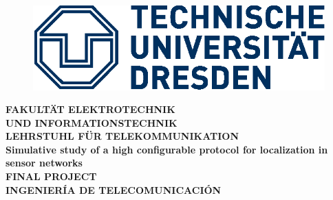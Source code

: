 \begin{center}
  \begin{figure}[ht]
    \begin{center}
      \includegraphics[scale=1]{logo_tud.eps}
    \end{center}
  \end{figure}
  \vspace{0.2cm}
  \Large{\textbf{FAKULT\"AT ELEKTROTECHNIK\\ UND INFORMATIONSTECHNIK}}\\
  \vspace{0.5cm}
  \Large{\textbf{LEHRSTUHL F\"UR TELEKOMMUNIKATION}}\\
  \vspace{4cm}
  \Huge{\textbf{Simulative study of a high configurable protocol for localization in sensor networks}}\\
  \vspace{3cm}
  \Large{\textbf{FINAL PROJECT}}\\
  \vspace{0.5cm}
  \large{\textbf{INGENIER\'IA DE TELECOMUNICACI\'ON}}\\
\end{center}

\vspace{4cm}
\centerline{ }
\vspace{0.2cm}
\centerline{ }
